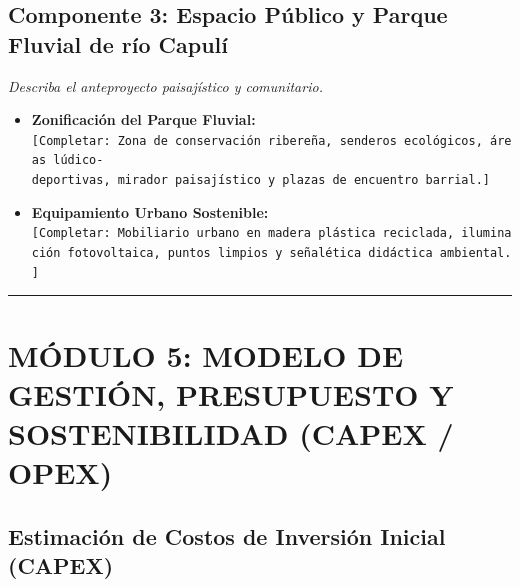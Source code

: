 \documentclass[
  letterpaper,
  DIV=11,
  numbers=noendperiod]{scrreprt}
\providecommand{\tightlist}{%
  \setlength{\itemsep}{0pt}\setlength{\parskip}{0pt}}
\begin{document}
\section{Componente 3: Espacio Público y Parque Fluvial de río
Capulí}\label{componente-3-espacio-puxfablico-y-parque-fluvial-de-ruxedo-capuluxed}

\emph{Describa el anteproyecto paisajístico y comunitario.}

\begin{itemize}
\tightlist
\item
  \textbf{Zonificación del Parque Fluvial:}\\
  \texttt{{[}Completar:\ Zona\ de\ conservación\ ribereña,\ senderos\ ecológicos,\ áreas\ lúdico-deportivas,\ mirador\ paisajístico\ y\ plazas\ de\ encuentro\ barrial.{]}}
\item
  \textbf{Equipamiento Urbano Sostenible:}\\
  \texttt{{[}Completar:\ Mobiliario\ urbano\ en\ madera\ plástica\ reciclada,\ iluminación\ fotovoltaica,\ puntos\ limpios\ y\ señalética\ didáctica\ ambiental.{]}}
\end{itemize}

\begin{center}\rule{0.5\linewidth}{0.5pt}\end{center}

\chapter{MÓDULO 5: MODELO DE GESTIÓN, PRESUPUESTO Y SOSTENIBILIDAD
(CAPEX /
OPEX)}\label{muxf3dulo-5-modelo-de-gestiuxf3n-presupuesto-y-sostenibilidad-capex-opex}

\section{Estimación de Costos de Inversión Inicial
(CAPEX)}\label{estimaciuxf3n-de-costos-de-inversiuxf3n-inicial-capex}
\end{document}
